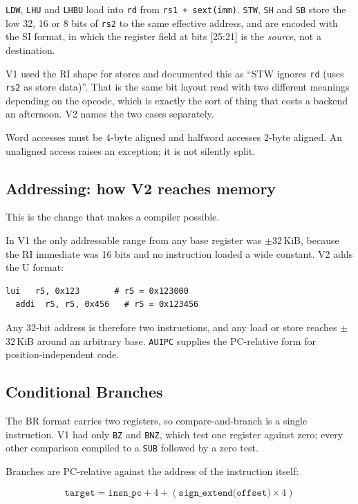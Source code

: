 \documentclass[11pt,a4paper]{article}
\begin{document}
{\tt LDW}, {\tt LHU} and {\tt LHBU} load into {\tt rd} from
{\tt rs1 + sext(imm)}. {\tt STW}, {\tt SH} and {\tt SB} store the low 32, 16 or 8
bits of {\tt rs2} to the same effective address, and are encoded with the SI
format, in which the register field at bits [25:21] is the \emph{source}, not a
destination.

V1 used the RI shape for stores and documented this as ``STW ignores {\tt rd}
(uses {\tt rs2} as store data)''. That is the same bit layout read with two
different meanings depending on the opcode, which is exactly the sort of thing
that costs a backend an afternoon. V2 names the two cases separately.

Word accesses must be 4-byte aligned and halfword accesses 2-byte aligned. An
unaligned access raises an exception; it is not silently split.

\subsection{Addressing: how V2 reaches memory}

This is the change that makes a compiler possible.

In V1 the only addressable range from any base register was
$\pm$32\,KiB, because the RI immediate was 16 bits and no instruction loaded a
wide constant. V2 adds the U format:

\begin{lstlisting}[style=Cstyle]
  lui   r5, 0x123       # r5 = 0x123000
  addi  r5, r5, 0x456   # r5 = 0x123456
\end{lstlisting}

Any 32-bit address is therefore two instructions, and any load or store reaches
$\pm$32\,KiB around an arbitrary base. {\tt AUIPC} supplies the PC-relative form
for position-independent code.

\subsection{Conditional Branches}

The BR format carries two registers, so compare-and-branch is a single
instruction. V1 had only {\tt BZ} and {\tt BNZ}, which test one register against
zero; every other comparison compiled to a {\tt SUB} followed by a zero test.

Branches are PC-relative against the address of the instruction itself:

\[
\texttt{target} = \texttt{insn\_pc} + 4 + (\texttt{sign\_extend(offset)} \times 4)
\]
\end{document}
